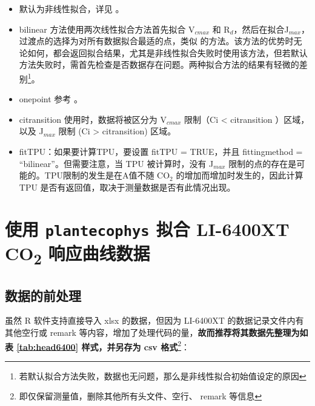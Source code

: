 \documentclass[
]{krantz}
\begin{document}
\begin{itemize}
\item
  默认为非线性拟合，详见 \citet{Duursma2015Plantecophys}。
\item
  bilinear 方法使用两次线性拟合方法首先拟合 V\(_{cmax}\) 和 R\(_{d}\)，然后在拟合J\(_{max}\)，过渡点的选择为对所有数据拟合最适的点，类似 \citet{Gu2010Reliable} 的方法。该方法的优势时无论如何，都会返回拟合结果，尤其是非线性拟合失败时使用该方法，但若默认方法失败时，需首先检查是否数据存在问题。两种拟合方法的结果有轻微的差别\footnote{若默认拟合方法失败，数据也无问题，那么是非线性拟合初始值设定的原因}。
\item
  onepoint 参考 \citet{De2016A}。
\item
  citransition 使用时，数据将被区分为 V\(_{cmax}\) 限制（Ci \textless{}
  citransition ）区域，以及 J\(_{max}\) 限制 (Ci \textgreater{} citransition) 区域。
\item
  fitTPU：如果要计算TPU，要设置 fitTPU = TRUE，并且 fittingmethod
  = ``bilinear''。但需要注意，当 TPU 被计算时，没有 J\(_{max}\) 限制的点的存在是可能的。TPU限制的发生是在A值不随
  CO\(_{2}\) 的增加而增加时发生的，因此计算 TPU 是否有返回值，取决于测量数据是否有此情况出现。
\end{itemize}

\cleardoublepage

\hypertarget{plantecophy_use}{%
\section{\texorpdfstring{使用 \texttt{plantecophys} 拟合 LI-6400XT CO\textsubscript{2} 响应曲线数据}{使用 plantecophys 拟合 LI-6400XT CO2 响应曲线数据}}\label{plantecophy_use}}

\hypertarget{data6400}{%
\subsection{数据的前处理}\label{data6400}}

虽然 R 软件支持直接导入 xlsx 的数据，但因为 LI-6400XT 的数据记录文件内有其他空行或 remark 等内容，增加了处理代码的量，\textbf{故而推荐将其数据先整理为如表 \ref{tab:head6400} 样式，并另存为 csv 格式}\footnote{即仅保留测量值，删除其他所有头文件、空行、 remark 等信息}：
\end{document}
